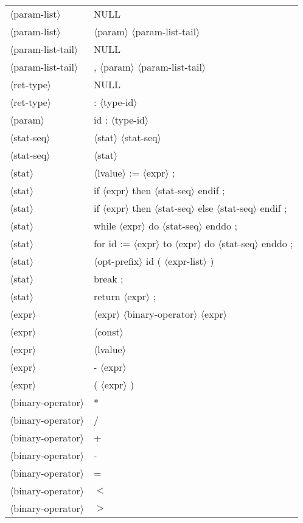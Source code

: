 \documentclass[11pt, fleqn]{article}
\newcommand{\atag}[1]{$\langle$#1$\rangle$}
\begin{document}
\begin{longtable}{l|l}
\atag{param-list}				&	NULL		\\
\atag{param-list}				&	\atag{param}	 \atag{param-list-tail}	\\
\atag{param-list-tail}			&	NULL		\\
\atag{param-list-tail}			&	, \atag{param} \atag{param-list-tail}		\\
\atag{ret-type}					&	NULL		\\
\atag{ret-type}					&	: \atag{type-id}		\\
\atag{param}						&	id : \atag{type-id}		\\
\atag{stat-seq}					&	\atag{stat} \atag{stat-seq}		\\
\atag{stat-seq}					&	\atag{stat}		\\
\atag{stat}						&	\atag{lvalue} := \atag{expr}	;	\\
\atag{stat}						&	if \atag{expr} then \atag{stat-seq} endif ;		\\
\atag{stat}						&	if \atag{expr} then \atag{stat-seq} else \atag{stat-seq} endif ;		\\
\atag{stat}						&	while \atag{expr} do \atag{stat-seq} enddo ;		\\
\atag{stat}						&	for id := \atag{expr} to \atag{expr} do \atag{stat-seq} enddo ;		\\
\atag{stat}						&	\atag{opt-prefix} id ( \atag{expr-list} ) \\
\atag{stat}						&	break ;		\\
\atag{stat}						&	return \atag{expr} ;		\\
\atag{expr}						&	\atag{expr} \atag{binary-operator} \atag{expr}		\\
\atag{expr}						&	\atag{const}		\\
\atag{expr}						&	\atag{lvalue}		\\
\atag{expr}						&	- \atag{expr}		\\
\atag{expr}						&	( \atag{expr} )		\\
\atag{binary-operator}			&	*	\\
\atag{binary-operator}			&	/	\\
\atag{binary-operator}			&	+	\\
\atag{binary-operator}			&	-	\\
\atag{binary-operator}			&	=	\\
\atag{binary-operator}			&	$<$	\\
\atag{binary-operator}			&	$>$	\\

\end{longtable}
\end{document}
